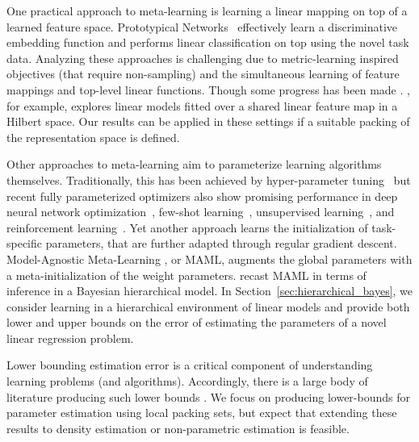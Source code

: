 One practical approach to meta-learning
is learning a linear mapping on top of a learned feature space. 
Prototypical Networks~\citep{snell2017prototypical} effectively learn a  discriminative embedding function and performs linear classification on top using the novel task data.
Analyzing these approaches is challenging due to metric-learning inspired objectives (that require non-\iid sampling) and the simultaneous learning of feature mappings and top-level linear functions. Though some progress has been made \citep{jin2009regularized, saunshi2019theoretical, wang2019multitask, du2020few}. \citet{maurer2009transfer}, for example, explores linear models fitted over a shared linear feature map in a Hilbert space. Our results can be applied in these settings if a suitable packing of the representation space is defined.

Other approaches to meta-learning aim to parameterize learning algorithms themselves. Traditionally, this has been achieved by hyper-parameter tuning~\citep{gpml,stn} but
recent fully parameterized optimizers also show promising performance in deep neural network optimization~\citep{l2l}, few-shot learning~\citep{ravi2016optimization}, unsupervised learning~\citep{metaunsup}, and reinforcement learning~\citep{duan2016rl2}. Yet another approach learns the initialization of task-specific parameters, that are further adapted through regular gradient descent. Model-Agnostic Meta-Learning \citep{finn2017model}, or MAML, augments the global parameters with a meta-initialization of the weight parameters. \citet{grant2018recasting} recast MAML in terms of inference in a Bayesian hierarchical model.
In Section~\ref{sec:hierarchical_bayes}, we consider learning in a hierarchical environment of linear models and provide both lower and upper bounds on the error of estimating the parameters of a novel linear regression problem.

Lower bounding estimation error is a critical component of understanding learning problems (and algorithms). Accordingly, there is a large body of literature producing such lower bounds \citep{khas1979lower, yang1999information, loh2017lower}. We focus on producing lower-bounds for parameter estimation using local packing sets, but expect that extending these results to density estimation or non-parametric estimation is feasible.
